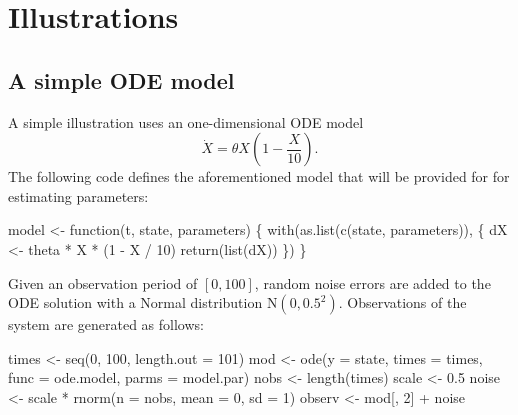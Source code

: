 \section{Illustrations} \label{sec:illustrations}
\subsection{A simple ODE model} \label{ssec:simpleode}
A simple illustration uses an one-dimensional ODE model
\begin{equation}
\dot{X} = \theta X (1-\frac{X}{10}).
\label{eq:simpleode}
\end{equation}
The following code defines the aforementioned model that will be provided for  for estimating parameters:
\begin{example*}
model <- function(t, state, parameters) \{
  with(as.list(c(state, parameters)), \{
    dX <- theta * X * (1 - X / 10)
    return(list(dX))
  \})
\}
\end{example*}
Given an observation period of $[0,100]$, random noise errors are added to the ODE solution with a Normal distribution $\text{N}(0,0.5^{2})$. Observations of the system are generated as follows:
\begin{example*}
times  <- seq(0, 100, length.out = 101)
mod    <- ode(y = state, times = times, func = ode.model, parms = model.par)
nobs   <- length(times)
scale  <- 0.5
noise  <- scale * rnorm(n = nobs, mean = 0, sd = 1)
observ <- mod[, 2] + noise
\end{example*}

